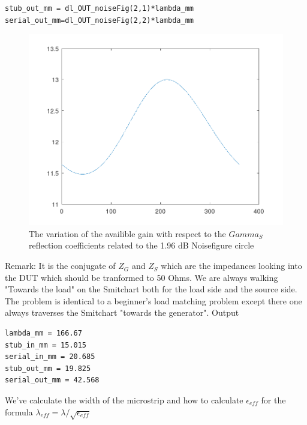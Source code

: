 \documentclass{article}
\begin{document}
\begin{multicols}{2}
\begin{verbatim}
stub_out_mm = dl_OUT_noiseFig(2,1)*lambda_mm
serial_out_mm=dl_OUT_noiseFig(2,2)*lambda_mm
\end{verbatim}

\begin{figure}[H]
\centering
  \includegraphics[width=\linewidth]{GainVariationOnNoisefigCircle.png}
  \caption{The variation of the availible gain with respect to the $Gamma_S$ reflection coefficients related to the 1.96 dB Noisefigure circle}
  \label{fig4}
\end{figure}
Remark: It is the conjugate of $Z_G$ and $Z_S$
which are the impedances looking into the DUT
which should be tranformed to 50 Ohms.
We are always walking "Towards the load" on the Smitchart
both for the load side and the source side.
The problem is identical to a beginner's load matching problem
except there one always traverses the Smitchart "towards the generator".
Output
\begin{verbatim}
lambda_mm = 166.67
stub_in_mm = 15.015
serial_in_mm = 20.685
stub_out_mm = 19.825
serial_out_mm = 42.568
\end{verbatim}
We've calculate
the width of the microstrip and how to calculate
$\epsilon_{eff}$ for the formula $\lambda_{eff}= \lambda/\sqrt{\epsilon_{eff}}$
\end{multicols}
\end{document}
